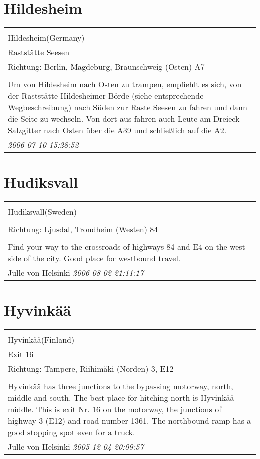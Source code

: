 \documentclass[a4paper,12pt]{article}
\begin{document}
\section{Hildesheim}
\begin{tabular}{|p{13cm}|}
\hline\\
Hildesheim(Germany)\\
Raststätte Seesen\\
Richtung: Berlin, Magdeburg, Braunschweig (Osten) A7 \\
\hline\\
Um von Hildesheim nach Osten zu trampen, empfiehlt es sich, von der Raststätte Hildesheimer Börde (siehe entsprechende Wegbeschreibung) nach Süden zur Raste Seesen zu fahren und dann die Seite zu wechseln. Von dort aus fahren auch Leute am Dreieck Salzgitter nach Osten über die A39 und schließlich auf die A2. \\
\textit{ 2006-07-10 15:28:52 }\\\hline
\end{tabular}


\section{Hudiksvall}
\begin{tabular}{|p{13cm}|}
\hline\\
Hudiksvall(Sweden)\\
\\
Richtung: Ljusdal, Trondheim (Westen) 84 \\
\hline\\
Find your way to the crossroads of highways 84 and E4 on the west side of the city. Good place for westbound travel. \\
Julle von Helsinki \textit{ 2006-08-02 21:11:17 }\\\hline
\end{tabular}


\section{Hyvinkää}
\begin{tabular}{|p{13cm}|}
\hline\\
Hyvinkää(Finland)\\
Exit 16\\
Richtung: Tampere, Riihimäki (Norden) 3, E12 \\
\hline\\
Hyvinkää has three junctions to the bypassing motorway, north, middle and south. The best place for hitching north is Hyvinkää middle. This is exit Nr. 16 on the motorway, the junctions of highway 3 (E12) and road number 1361. The northbound ramp has a good stopping spot even for a truck. \\
Julle von Helsinki \textit{ 2005-12-04 20:09:57 }\\\hline
\end{tabular}
\end{document}
